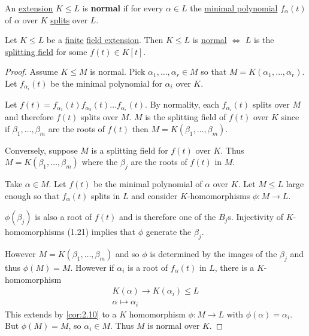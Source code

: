 \documentclass{article}
\newenvironment{manual}[1]{%
    \renewcommand\themanualinner{#1}%
    \manualinner
}{\endmanualinner}
\begin{document}
\begin{manual}{Definition 1.25}[Normal extension]
    An \hyperlink{def:fieldExt}{extension} $K \leq L$ is \textbf{normal} if for every $\alpha \in L$ the \hyperlink{def:minimalPoly}{minimal polynomial} $f_\alpha(t)$ of $\alpha$ over $K$ \hyperlink{def:splitting}{splits} over $L$.
\end{manual}

\begin{manual}{Theorem 1.26}
    Let $K \leq L$ be a \hyperlink{def:degreeOfFieldExt}{finite} \hyperlink{def:fieldExt}{field extension}. Then $K \leq L$ is \hyperlink{def:normal}{normal} $\iff$ $L$ is the \hyperlink{def:splitting}{splitting field} for some $f(t) \in K[t]$.
\end{manual}

\begin{proof}
    Assume $K \leq M$ is normal. Pick $\alpha_1, \dotsc, \alpha_r \in M$ so that $M = K(\alpha_1, \dotsc, \alpha_r)$.
    Let $f_{\alpha_i}(t)$ be the minimal polynomial for $\alpha_i$ over $K$.

    Let $f(t) = f_{\alpha_1}(t) f_{\alpha_2}(t)  \dotsc f_{\alpha_r}(t)$.
    By normality, each $f_{\alpha_i}(t)$ splits over $M$ and therefore $f(t)$ splits over $M$.
    $M$ is the splitting field of $f(t)$ over $K$ since if $\beta_1, \dotsc, \beta_m$ are the roots of $f(t)$ then $M=K(\beta_1, \dotsc, \beta_m)$.

    Conversely, suppose $M$ is a splitting field for $f(t)$ over $K$. Thus $M= K(\beta_1, \dotsc, \beta_m)$ where the $\beta_j$ are the roots of $f(t)$ in $M$.

    Take $\alpha\in M$. Let $f(t)$ be the minimal polynomial of $\alpha$ over $K$.
    Let $M \leq L$ large enough so that $f_\alpha(t)$ splits in $L$ and consider $K$-homomorphisms $\phi:M \to L$.

    $\phi(\beta_j)$ is also a root of $f(t)$ and is therefore one of the $B_j$s. Injectivity of $K$-homomorphisms (1.21) implies that $\phi$ generate the $\beta_j$.

    However $M = K(\beta_1, \dotsc, \beta_m)$ and so $\phi$ is determined by the images of the $\beta_j$ and thus $\phi(M) = M$.
    However if $\alpha_i$ is a root of $f_\alpha(t)$ in $L$, there is a $K$-homomorphism
    \begin{align*}
        K(\alpha) \to K(\alpha_i) \leq L \\
        \alpha \mapsto \alpha_i
    \end{align*}
    This extends by \cref{cor:2.10} to a $K$ homomorphism $\phi: M \to L$ with $\phi(\alpha) = \alpha_i$.
    But $\phi(M) = M$, so $\alpha_i \in M$. Thus $M$ is normal over $K$.
\end{proof}
\end{document}
